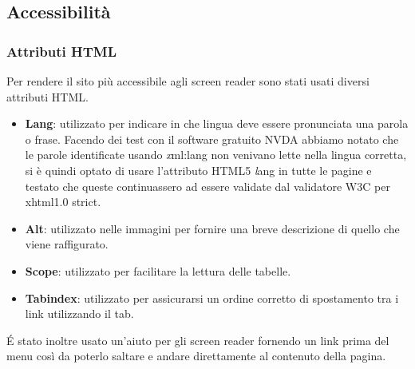 \documentclass{article}
\begin{document}
		\subsection{Accessibilità}
			\subsubsection{Attributi HTML}
				Per rendere il sito più accessibile agli screen reader sono stati usati diversi attributi HTML.
					\begin{itemize}
						\item {\bfseries Lang}: utilizzato per indicare in che lingua deve essere pronunciata una parola o frase. Facendo dei test con il software gratuito NVDA abbiamo notato che le parole identificate usando {\textit xml:lang} non venivano lette nella lingua corretta, si è quindi optato di usare l'attributo HTML5 {\textit lang} in tutte le pagine e testato che queste continuassero ad essere validate dal validatore W3C per xhtml1.0 strict.
						\item  {\bfseries Alt}: utilizzato nelle immagini per fornire una breve descrizione di quello che viene raffigurato.
						\item {\bfseries Scope}: utilizzato per facilitare la lettura delle tabelle.
						\item  {\bfseries Tabindex}: utilizzato per assicurarsi un ordine corretto di spostamento tra i link utilizzando il tab.
					\end{itemize}
				\'E stato inoltre usato un'aiuto per gli screen reader fornendo un link prima del menu così da poterlo saltare e andare direttamente al contenuto della pagina.
\end{document}
